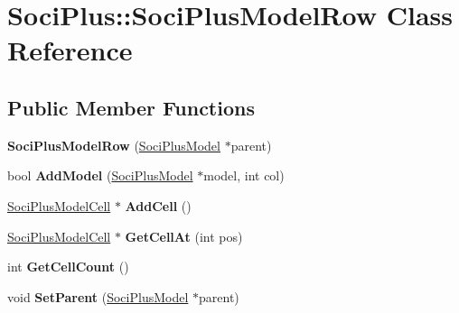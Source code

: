 \hypertarget{class_soci_plus_1_1_soci_plus_model_row}{\section{Soci\+Plus\+:\+:Soci\+Plus\+Model\+Row Class Reference}
\label{class_soci_plus_1_1_soci_plus_model_row}
}
\subsection*{Public Member Functions}
\begin{DoxyCompactItemize}
\item 
\hypertarget{class_soci_plus_1_1_soci_plus_model_row_a881edcf6264ec026738141635511fdfb}{{\bfseries Soci\+Plus\+Model\+Row} (\hyperlink{class_soci_plus_1_1_soci_plus_model}{Soci\+Plus\+Model} $\ast$parent)}\label{class_soci_plus_1_1_soci_plus_model_row_a881edcf6264ec026738141635511fdfb}

\item 
\hypertarget{class_soci_plus_1_1_soci_plus_model_row_a5eb96dbe145ed38d598dee95f74279a5}{bool {\bfseries Add\+Model} (\hyperlink{class_soci_plus_1_1_soci_plus_model}{Soci\+Plus\+Model} $\ast$model, int col)}\label{class_soci_plus_1_1_soci_plus_model_row_a5eb96dbe145ed38d598dee95f74279a5}

\item 
\hypertarget{class_soci_plus_1_1_soci_plus_model_row_a503d6587957265cf7f42d01dc2f3a79d}{\hyperlink{class_soci_plus_1_1_soci_plus_model_cell}{Soci\+Plus\+Model\+Cell} $\ast$ {\bfseries Add\+Cell} ()}\label{class_soci_plus_1_1_soci_plus_model_row_a503d6587957265cf7f42d01dc2f3a79d}

\item 
\hypertarget{class_soci_plus_1_1_soci_plus_model_row_aef34131ea253fe8af5d275108839e807}{\hyperlink{class_soci_plus_1_1_soci_plus_model_cell}{Soci\+Plus\+Model\+Cell} $\ast$ {\bfseries Get\+Cell\+At} (int pos)}\label{class_soci_plus_1_1_soci_plus_model_row_aef34131ea253fe8af5d275108839e807}

\item 
\hypertarget{class_soci_plus_1_1_soci_plus_model_row_ad80ad9e027bc08f9818fdd96b8278f7a}{int {\bfseries Get\+Cell\+Count} ()}\label{class_soci_plus_1_1_soci_plus_model_row_ad80ad9e027bc08f9818fdd96b8278f7a}

\item 
\hypertarget{class_soci_plus_1_1_soci_plus_model_row_aeb7a0bcb93a52a5cd00dc29969ed63ef}{void {\bfseries Set\+Parent} (\hyperlink{class_soci_plus_1_1_soci_plus_model}{Soci\+Plus\+Model} $\ast$parent)}\label{class_soci_plus_1_1_soci_plus_model_row_aeb7a0bcb93a52a5cd00dc29969ed63ef}


\end{DoxyCompactItemize}
